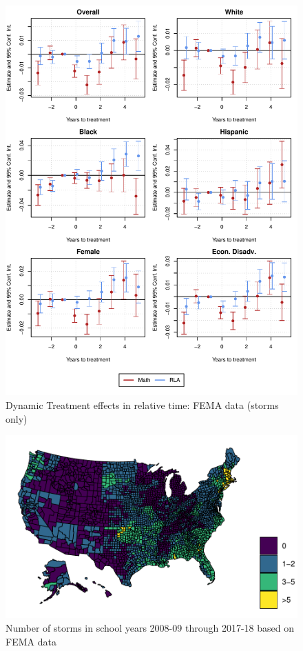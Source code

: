 \begin{figure}[!h]
	\centering
	\includegraphics[scale=1]{"../Code & Data/ResultsPlotFEMAStorm.pdf"}
	\caption{Dynamic Treatment effects in relative time: FEMA data (storms only)}
	\label{ResultsPlotFEMAStorm}
\end{figure}


\begin{figure}[!h]
	\centering
	\includegraphics[scale=1]{"../Code & Data/StormsFEMA.pdf"}
	\caption{Number of storms in school years 2008-09 through 2017-18 based on FEMA data}
	\label{StormsFEMA}
\end{figure}

